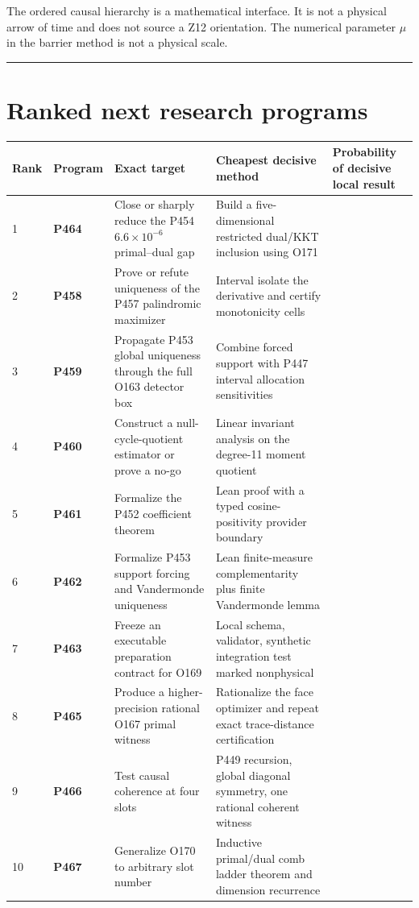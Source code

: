 \documentclass[11pt,a4paper,openany]{report}
\begin{document}
The ordered causal hierarchy is a mathematical interface. It is not a physical arrow of time and does not source a Z12 orientation. The numerical parameter \(\mu\) in the barrier method is not a physical scale.

\par\medskip\hrule\medskip

\chapter{Ranked next research programs}

\begin{center}
\begingroup\fontsize{7}{8.4}\selectfont
\setlength{\tabcolsep}{2.5pt}
\renewcommand{\arraystretch}{1.16}
\begin{longtable}{@{}p{}p{}p{}p{}p{}@{}}
\toprule
\textbf{Rank} & \textbf{Program} & \textbf{Exact target} & \textbf{Cheapest decisive method} & \textbf{Probability of decisive local result} \\
\midrule
\endhead
1 & \textbf{P464} & Close or sharply reduce the P454 \(6.6\times10^{-6}\) primal--dual gap & Build a five-dimensional restricted dual/\allowbreak{}KKT inclusion using O171 &  \\
2 & \textbf{P458} & Prove or refute uniqueness of the P457 palindromic maximizer & Interval isolate the derivative and certify monotonicity cells &  \\
3 & \textbf{P459} & Propagate P453 global uniqueness through the full O163 detector box & Combine forced support with P447 interval allocation sensitivities &  \\
4 & \textbf{P460} & Construct a null-cycle-quotient estimator or prove a no-go & Linear invariant analysis on the degree-11 moment quotient &  \\
5 & \textbf{P461} & Formalize the P452 coefficient theorem & Lean proof with a typed cosine-positivity provider boundary &  \\
6 & \textbf{P462} & Formalize P453 support forcing and Vandermonde uniqueness & Lean finite-measure complementarity plus finite Vandermonde lemma &  \\
7 & \textbf{P463} & Freeze an executable preparation contract for O169 & Local schema, validator, synthetic integration test marked nonphysical &  \\
8 & \textbf{P465} & Produce a higher-precision rational O167 primal witness & Rationalize the face optimizer and repeat exact trace-distance certification &  \\
9 & \textbf{P466} & Test causal coherence at four slots & P449 recursion, global diagonal symmetry, one rational coherent witness &  \\
10 & \textbf{P467} & Generalize O170 to arbitrary slot number & Inductive primal/\allowbreak{}dual comb ladder theorem and dimension recurrence &  \\
\bottomrule
\end{longtable}
\endgroup
\end{center}
\end{document}
